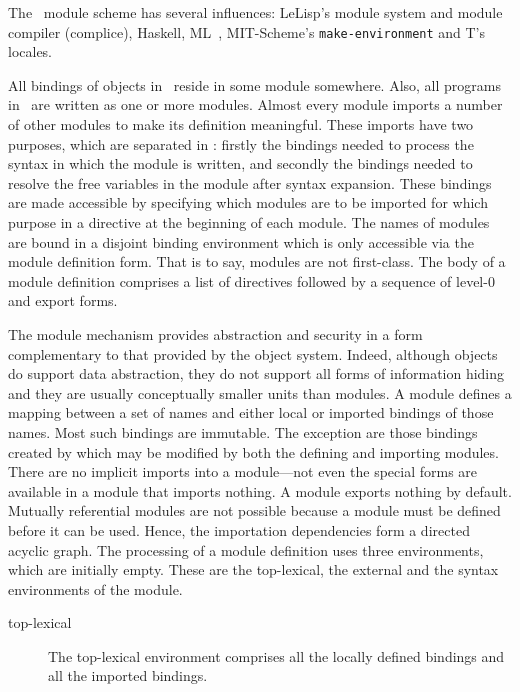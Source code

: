 \label{sec:modules}
%
\begin{optDefinition}
The \eulisp\ module scheme has several influences:
LeLisp's module system and module compiler (complice),
Haskell, ML~, MIT-Scheme's {\tt make-environment} and T's locales.

All bindings of objects in \eulisp\ reside in some module somewhere.  Also, all
programs in \eulisp\ are written as one or more modules.  Almost every module
imports a number of other modules to make its definition meaningful.  These
imports have two purposes, which are separated in \eulisp: firstly the bindings
needed to process the syntax in which the module is written, and secondly the
bindings needed to resolve the free variables in the module after syntax
expansion.  These bindings are made accessible by specifying which modules are
to be imported for which purpose in a directive at the beginning of each module.
The names of modules are bound in a disjoint binding
environment which is only accessible via the module definition form.  That
is to say, modules are not first-class.  The body of a module definition
comprises a list of directives followed by a sequence of level-0 and export
forms.

The module mechanism provides abstraction and security in a form complementary
to that provided by the object system.  Indeed, although objects do support data
abstraction, they do not support all forms of information hiding and they are
usually conceptually smaller units than modules.  A module defines a mapping
between a set of names and either local or imported bindings of those names.
Most such bindings are immutable.  The exception are those bindings created by
 which may be modified by both the defining and importing
modules.  There are no implicit imports into a module---not even the special
forms are available in a module that imports nothing.  A module exports nothing
by default.  Mutually referential modules are not possible because a module must
be defined before it can be used.  Hence, the importation dependencies form a
directed acyclic graph.
%
The processing of a module definition uses three environments, which are
initially empty.  These are the top-lexical, the external and the syntax
environments of the module.
%
\begin{description}
    \item[top-lexical] The top-lexical environment comprises all the locally
    defined bindings and all the imported bindings.


\end{description}
\end{optDefinition}

